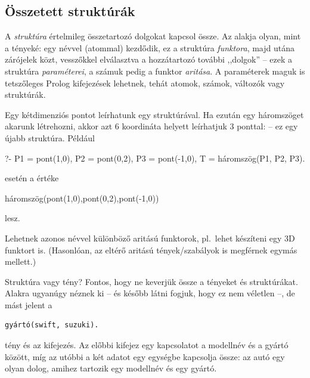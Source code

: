 \subsection*{Összetett struktúrák}
A \emph{struktúra} értelmileg összetartozó dolgokat
kapcsol össze. Az alakja olyan, mint a tényeké: egy
névvel (atommal) kezdődik, ez a struktúra
\emph{funktora}, majd utána zárójelek közt,
vesszőkkel elválasztva a hozzátartozó további
,,dolgok'' -- ezek a struktúra \emph{paraméterei}, a
számuk pedig a funktor \emph{aritása}.
A paraméterek maguk is tetszőleges Prolog
kifejezések lehetnek, tehát atomok, számok, változók
vagy struktúrák.

Egy kétdimenziós pontot leírhatunk egy
 struktúrával. Ha ezután egy
háromszöget akarunk létrehozni, akkor azt 6
koordináta helyett leírhatjuk 3 ponttal:
 -- ez egy újabb
struktúra. Például
\begin{query}
?- P1 = pont(1,0), P2 = pont(0,2), P3 = pont(-1,0),
   T = háromszög(P1, P2, P3).
\end{query}
esetén a  értéke
\begin{query}
háromszög(pont(1,0),pont(0,2),pont(-1,0))
\end{query}
lesz.

Lehetnek azonos névvel különböző aritású funktorok,
pl.~lehet készíteni egy 3D  funktort
is. (Hasonlóan, az eltérő aritású tények/szabályok is
megférnek egymás mellett.)

\begin{infobox*}{}{Struktúra vagy tény?}
Fontos, hogy ne keverjük össze a tényeket és
struktúrákat. Alakra ugyanúgy néznek ki -- és
később látni fogjuk, hogy ez nem véletlen --, de
mást jelent a
\begin{verbatim}
gyártó(swift, suzuki).
\end{verbatim}
tény és az  kifejezés. Az
előbbi kifejez egy kapcsolatot a modellnév és a
gyártó között, míg az utóbbi a két adatot egy
egységbe kapcsolja össze: az autó egy olyan dolog,
amihez tartozik egy modellnév és egy gyártó.
\end{infobox*}

